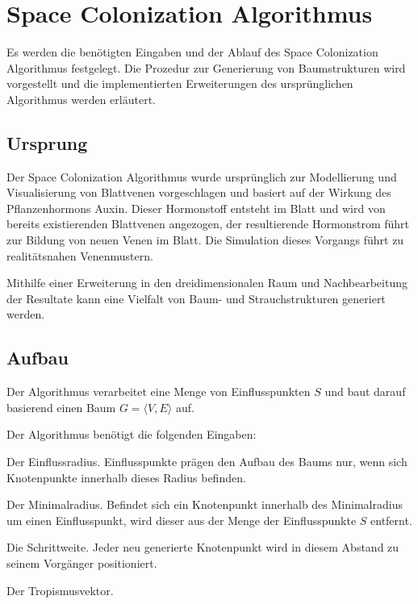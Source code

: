 \chapter{Space Colonization Algorithmus}

Es werden die benötigten Eingaben und der Ablauf des Space Colonization Algorithmus festgelegt. Die Prozedur zur Generierung von Baumstrukturen wird vorgestellt und die implementierten Erweiterungen des ursprünglichen Algorithmus werden erläutert.

\section{Ursprung}
Der Space Colonization Algorithmus wurde ursprünglich zur Modellierung und Visualisierung von Blattvenen vorgeschlagen und basiert auf der Wirkung des Pflanzenhormons Auxin. Dieser Hormonstoff entsteht im Blatt und wird von bereits existierenden Blattvenen angezogen, der resultierende Hormonstrom führt zur Bildung von neuen Venen im Blatt. Die Simulation dieses Vorgangs führt zu realitätsnahen Venenmustern. \cite[Abschn. 2.5]{LeafVenation:05}

Mithilfe einer Erweiterung in den dreidimensionalen Raum und Nachbearbeitung der Resultate kann eine Vielfalt von Baum- und Strauchstrukturen generiert werden. \cite[Abschn. 1]{SpaceColonizationAlgorithm:07}

\section{Aufbau}

Der Algorithmus verarbeitet eine Menge von Einflusspunkten $S$ und baut darauf basierend einen Baum $G = \langle V,E \rangle$ auf. 

Der Algorithmus benötigt die folgenden Eingaben:

\begin{description}[labelindent]
	\item[\boldmath$d_i$] Der Einflussradius. Einflusspunkte prägen den Aufbau des Baums nur, wenn sich Knotenpunkte innerhalb dieses Radius befinden. \cite[Abschn. 2]{SpaceColonizationAlgorithm:07}\\
	
	\item[\boldmath$d_k$] Der Minimalradius. Befindet sich ein Knotenpunkt innerhalb des Minimalradius um einen Einflusspunkt, wird dieser aus der Menge der Einflusspunkte $S$ entfernt. \cite[Abschn. 2]{SpaceColonizationAlgorithm:07}\\
	
	\item[\boldmath$D$] Die Schrittweite. Jeder neu generierte Knotenpunkt wird in diesem Abstand zu seinem Vorgänger positioniert. \cite[Abschn. 2]{SpaceColonizationAlgorithm:07} \\
	
	\item[\boldmath$\overrightarrow{T}$] Der Tropismusvektor. 

\end{description}

